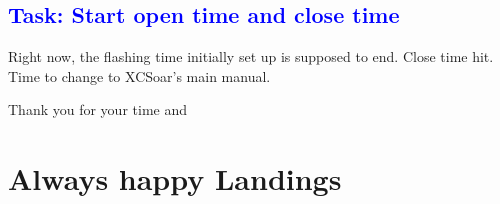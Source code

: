 \subsection*{\textcolor{blue}{Task: Start open time and close time}}
Right now, the flashing time initially set up is supposed to end.
Close time hit. Time to change to XCSoar's main manual.

Thank you for your time and

\section{Always happy Landings}%

\printindex

